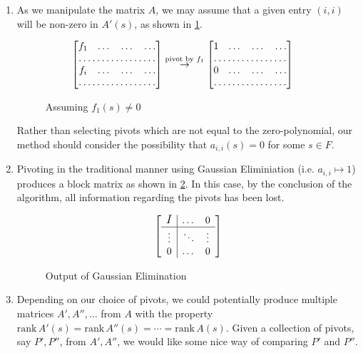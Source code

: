 \documentclass{amsart}
\theoremstyle{definition}
\theoremstyle{remark}
\numberwithin{equation}{section}
\begin{document}
\begin{enumerate}
\item As we manipulate the matrix $A$, we may assume that a given entry $(i,i)$ will be non-zero in $A'(s)$, as shown in \cref{fig:pivot-example}.
\begin{figure}[h]
  \centering
  \begin{align*}
    \begin{bmatrix}
      f_1 & \dots & \dots & \dots \\
      \hdotsfor{4} \\
      f_i & \dots & \dots & \dots \\
      \hdotsfor{4}
    \end{bmatrix} & \overset{\text{pivot by } f_1}{\to} \begin{bmatrix}
      1 & \dots & \dots & \dots \\
      \hdotsfor{4} \\
      0 & \dots & \dots & \dots \\
      \hdotsfor{4}
    \end{bmatrix}
  \end{align*}
  \caption{Assuming $f_1(s) \not= 0$}
  \label{fig:pivot-example}
\end{figure}

Rather than selecting pivots which are not equal to the zero-polynomial, our method should consider the possibility that $a_{i,i}(s) = 0$ for some $s \in F$.

\item Pivoting in the traditional manner using Gaussian Eliminiation (i.e. $a_{i,i} \mapsto 1$) produces a block matrix as shown in \cref{fig:gaussian-eliminiation-example}. In this case, by the conclusion of the algorithm, all information regarding the pivots has been lost.
\begin{figure}[h]
  \centering
  \begin{equation*}
    \left[
    \begin{array}{c | c c }
      \raisebox{0pt}{{\large\mbox{{$I$}}}} & \dots & 0 \\ \hline
      \vdots & \ddots & \vdots \\
      0 & \dots & 0
    \end{array}
    \right]
  \end{equation*}
  \caption{Output of Gaussian Elimination}
  \label{fig:gaussian-eliminiation-example}
\end{figure}

\item Depending on our choice of pivots, we could potentially produce multiple matrices $A', A'', \ldots$ from $A$ with the property $\mathrm{rank} \, A'(s) = \mathrm{rank} \, A''(s) = \cdots = \mathrm{rank} \, A(s)$. Given a collection of pivots, say $P', P''$, from $A', A''$, we would like some nice way of comparing $P'$ and $P''$.

\end{enumerate}
\end{document}

